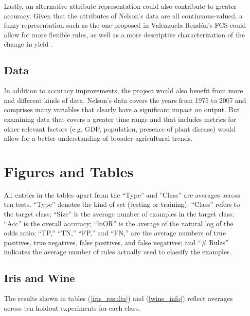 \documentclass[11pt]{article}
\begin{document}
Lastly, an alternative attribute representation could also contribute to greater accuracy. Given that the attributes of Nelson's data are all continuous-valued, a fuzzy representation such as the one proposed in 
Valenzuela-Rend\'on's FCS could allow for more flexible rules, as well as a more descriptive characterization of the change in yield \cite{manuel_valenzuela-rendon_fuzzy_1991}.

\subsection{Data}

In addition to accuracy improvements, the project would also benefit from more and different kinds of data. Nelson's data covers the years from 1975 to 2007 and comprises many variables that clearly have a significant impact on output. But examining data that covers a greater time range and that includes metrics for other relevant factors (e.g. GDP, population, presence of plant disease) would allow for a better understanding of broader agricultural trends.

\section{Figures and Tables}

All entries in the tables apart from the ``Type'' and  ''Class'' are averages across ten tests. ``Type'' denotes the kind of set (testing or training); ``Class'' refers to the target class; ``Size'' is the average number of examples in the target class; ``Acc'' is the overall accuracy; ``lnOR'' is the average of the natural log of the odds ratio; ``TP,'' ``TN,'' ``FP,'' and ``FN,'' are the average numbers of true positives, true negatives, false positives, and false negatives; and ``\# Rules'' indicates the average number of rules actually used to classify the examples.

\subsection{Iris and Wine}

The results shown in tables (\ref{iris_results}) and (\ref{wine_info}) reflect averages across ten holdout experiments for each class.
\end{document}
